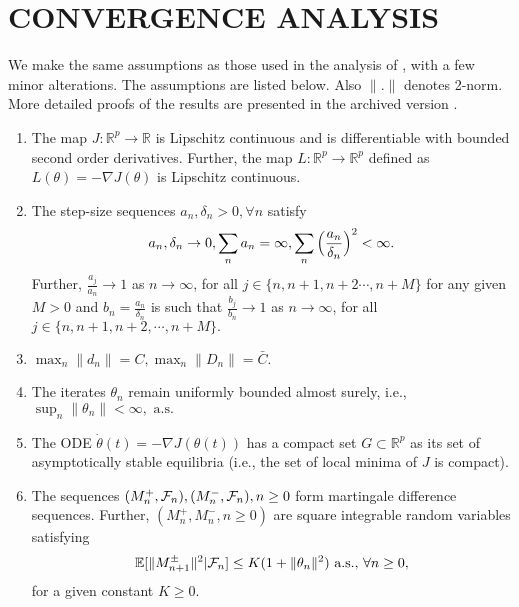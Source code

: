 \section{CONVERGENCE ANALYSIS}
\label{sec:convergenceresults}
We make the same assumptions as those used in the analysis of \cite{spall}, with a 
few minor alterations. The assumptions are listed below. Also $\|.\|$ denotes 2-norm. 
More detailed proofs of the results are presented in the archived version \cite{2017arXiv170206250K}.
\begin{enumerate}[label= \textbf{(A\arabic*)}]
 \item The map $J:\mathbb{R}^p \rightarrow \mathbb{R}$ is Lipschitz continuous and 
 is differentiable with bounded second order derivatives. Further, 
 the map $L:\mathbb{R}^p \rightarrow \mathbb{R}^p$ defined as 
 $L(\theta)=-\nabla J(\theta)$ is Lipschitz continuous.
 \item The step-size sequences $a_n, \delta_n >0, \forall n $  satisfy
 \begin{equation*}\label{stepsizes}
 a_n,\delta_n \rightarrow 0 , \sum_na_n=\infty,
 \sum_n \Big{(}\frac{a_n}{\delta_n}\Big{)}^2<\infty.
 \end{equation*}
 Further, $\frac{a_j}{a_n}\rightarrow 1$ as $n\rightarrow \infty$, for all
 $j \in \{n,n+1,n+2\cdots,n+M\}$ for any given $M>0$ and $b_n=\frac{a_n}{\delta_n}$ is 
 such that $\frac{b_j}{b_n}\rightarrow 1$ as $n\rightarrow \infty$, for all
 $j \in \{n,n+1,n+2,\cdots,n+M\}.$

 \item $\max_n \|d_n\|= C, \max_n \|D_n\|= \bar{C}$. 
 
 \item The iterates $\theta_n$ remain uniformly bounded almost surely, i.e.,
 $ \sup_n\|\theta_n\|<\infty, \text{ a.s.}$

 \item The ODE $\dot{\theta}(t)=-\nabla J(\theta(t))$ has a compact set 
 $G \subset \mathbb{R}^p$ as its set of asymptotically stable equilibria
 (i.e., the set of local minima of $J$ is compact).
 
 
 \item The sequences $(M_{n}^{+},\mathcal{F}_n),(M_{n}^{-},\mathcal{F}_n), n\geq0 $ form martingale difference sequences.
 Further, $(M_{n}^{+},M_{n}^{-},n\geq0)$ are square integrable random variables satisfying
 $$\mathbb{E}[\|M_{n+1}^{\pm}\|^2|\mathcal{F}_n]\leq K(1+\|\theta_n\|^2) \text{ a.s., } \forall n\geq0,$$
 for a given constant $K \geq 0.$
 
\end{enumerate}
